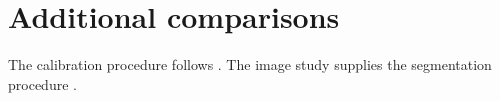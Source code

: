 \appendix
\section{Additional comparisons}
The calibration procedure follows .
The image study supplies the segmentation procedure \citep{shared}.
\nocite{background}
